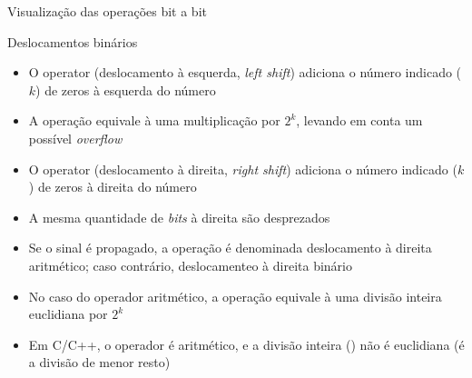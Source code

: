 \begin{frame}[fragile]{Visualização das operações bit a bit}

\end{frame}

\begin{frame}[fragile]{Deslocamentos binários}

    \begin{itemize}
        \item O operator  (deslocamento à esquerda, \textit{left shift}) adiciona
            o número indicado ($k$) de zeros à esquerda do número

        \item A operação equivale à uma multiplicação por $2^k$, levando em conta um possível
            \textit{overflow} 

        \item O operator  (deslocamento à direita, \textit{right shift}) adiciona
            o número indicado ($k$) de zeros à direita do número

        \item A mesma quantidade de \textit{bits} à direita são desprezados

        \item Se o sinal é propagado, a operação é denominada deslocamento à direita aritmético;
            caso contrário, deslocamenteo à direita binário

        \item No caso do operador aritmético, a operação equivale à uma divisão inteira 
            euclidiana por $2^k$

        \item Em C/C++, o operador  é aritmético, e a divisão inteira ()
            não é euclidiana (é a divisão de menor resto)
    \end{itemize}

\end{frame}

